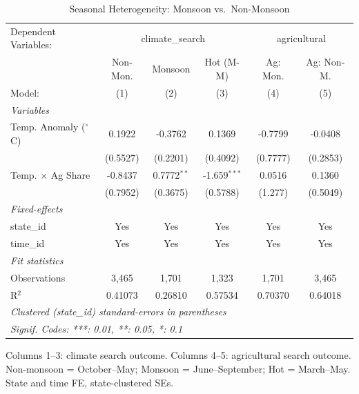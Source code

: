 
\begin{table}[htbp]
   \caption{\label{tab:seasonal} Seasonal Heterogeneity: Monsoon vs.\ Non-Monsoon}
   \centering
   \begin{tabular}{lccccc}
      \tabularnewline \midrule \midrule
      Dependent Variables: & \multicolumn{3}{c}{climate\_search} & \multicolumn{2}{c}{agricultural}\\
                                 & Non-Mon. & Monsoon       & Hot (M-M)      & Ag: Mon. & Ag: Non-M. \\   
      Model:                     & (1)      & (2)           & (3)            & (4)      & (5)\\  
      \midrule
      \emph{Variables}\\
      Temp. Anomaly ($^\circ$C)  & 0.1922   & -0.3762       & 0.1369         & -0.7799  & -0.0408\\   
                                 & (0.5527) & (0.2201)      & (0.4092)       & (0.7777) & (0.2853)\\   
      Temp. $\times$ Ag Share    & -0.8437  & 0.7772$^{**}$ & -1.659$^{***}$ & 0.0516   & 0.1360\\   
                                 & (0.7952) & (0.3675)      & (0.5788)       & (1.277)  & (0.5049)\\   
      \midrule
      \emph{Fixed-effects}\\
      state\_id                  & Yes      & Yes           & Yes            & Yes      & Yes\\  
      time\_id                   & Yes      & Yes           & Yes            & Yes      & Yes\\  
      \midrule
      \emph{Fit statistics}\\
      Observations               & 3,465    & 1,701         & 1,323          & 1,701    & 3,465\\  
      R$^2$                      & 0.41073  & 0.26810       & 0.57534        & 0.70370  & 0.64018\\  
      \midrule \midrule
      \multicolumn{6}{l}{\emph{Clustered (state\_id) standard-errors in parentheses}}\\
      \multicolumn{6}{l}{\emph{Signif. Codes: ***: 0.01, **: 0.05, *: 0.1}}\\
   \end{tabular}
   
   \par \raggedright 
   Columns 1--3: climate search outcome. Columns 4--5: agricultural search outcome. Non-monsoon = October--May; Monsoon = June--September; Hot = March--May. State and time FE, state-clustered SEs.
\end{table}


